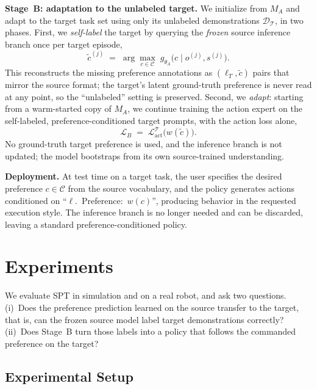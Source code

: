 \documentclass{article}
\begin{document}
\textbf{Stage~B: adaptation to the unlabeled target.}
We initialize from $M_A$ and adapt to the target task set using only its
unlabeled demonstrations $\mathcal{D}_{\mathcal{T}}$, in two phases.
First, we \emph{self-label} the target by querying the \emph{frozen} source
inference branch once per target episode,
\begin{equation}
  \tilde{c}^{(j)} \;=\; \arg\max_{c\in\mathcal{C}}\; g_{\theta_A}\!\big(c \mid o^{(j)},s^{(j)}\big).
  \label{eq:pseudolabel}
\end{equation}
This reconstructs the missing preference annotations as $(\ell_T,\tilde{c})$ pairs
that mirror the source format; the target's latent ground-truth preference is
never read at any point, so the ``unlabeled'' setting is preserved.
Second, we \emph{adapt}: starting from a warm-started copy of $M_A$, we continue
training the action expert on the self-labeled, preference-conditioned target
prompts, with the action loss alone,
\begin{equation}
  \mathcal{L}_{B} \;=\; \mathcal{L}^{\mathcal{T}}_{\mathrm{act}}\!\big(w(\tilde{c})\big).
  \label{eq:stageB}
\end{equation}
No ground-truth target preference is used, and the inference branch is not
  updated; the model bootstraps from its own source-trained understanding.

\textbf{Deployment.}
At test time on a target task, the user specifies the desired preference
$c\in\mathcal{C}$ from the source vocabulary, and the policy generates actions
conditioned on ``$\ell$.~Preference:~$w(c)$'', producing behavior in the
requested execution style. The inference branch is no longer needed and can be
discarded, leaving a standard preference-conditioned policy.




\section{Experiments}
\label{sec:experiments}

We evaluate SPT in simulation and on a real robot, and ask two questions.
(i)~Does the preference prediction learned on the source transfer to the target,
that is, can the frozen source model label target demonstrations correctly?
(ii)~Does Stage~B turn those labels into a policy that follows the commanded
preference on the target?

\subsection{Experimental Setup}
\label{sec:setup}
\end{document}
